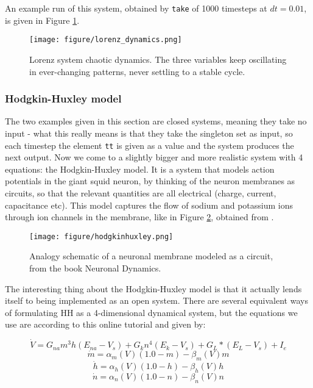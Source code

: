 An example run of this system, obtained by \texttt{take} of 1000 timesteps at $dt = 0.01$, is given in Figure \ref{fig:lorenz_dynamics}.

\begin{figure}
    \centering
    \texttt{[image: figure/lorenz\_dynamics.png]}
    \caption{Lorenz system chaotic dynamics. The three variables keep oscillating in ever-changing patterns, never settling to a stable cycle.}
    \label{fig:lorenz_dynamics}
\end{figure}


\subsubsection{Hodgkin-Huxley model}
The two examples given in this section are closed systems, meaning they take no input - what this really means is that they take the singleton set as input, so each timestep the element \texttt{tt} is given as a value and the system produces the next output. Now we come to a slightly bigger and more realistic system with 4 equations: the Hodgkin-Huxley \cite{hodgkin1952quantitative} model. It is a system that models action potentials in the giant squid neuron, by thinking of the neuron membranes as circuits, so that the relevant quantities are all electrical (charge, current, capacitance etc). This model captures the flow of sodium and potassium ions through ion channels in the membrane, like in Figure \ref{fig:hodgkinhuxleyschematic}, obtained from \cite{gerstner2014neuronal}.

\begin{figure}
    \centering
    \texttt{[image: figure/hodgkinhuxley.png]}
    \caption{Analogy schematic of a neuronal membrane modeled as a circuit, from the book Neuronal Dynamics.}
    \label{fig:hodgkinhuxleyschematic}
\end{figure}

The interesting thing about the Hodgkin-Huxley model is that it actually lends itself to being implemented as an open system. There are several equivalent ways of formulating HH as a 4-dimensional dynamical system, but the equations we use are according to this online tutorial \cite{https://mark-kramer.github.io/Case-Studies-Python/HH.html} and given by:

\begin{equation}
\dot{V} =  G_{na}m^3h(E_{na} - V_s) + G_kn^4(E_k - V_s) + G_L * (E_L - V_s) + I_e
\label{eq:voltage}
\end{equation}
\begin{equation}
\dot{m} = \alpha_m(V)(1.0 - m) - \beta_m(V)m
\label{eq:mhh}
\end{equation}
\begin{equation}
\dot{h} = \alpha_h(V)(1.0 - h) - \beta_h(V)h
\label{eq:hhh}
\end{equation}
\begin{equation}
\dot{n} = \alpha_n(V)(1.0 - n) - \beta_n(V)n   
\label{eq:nhh}
\end{equation}

